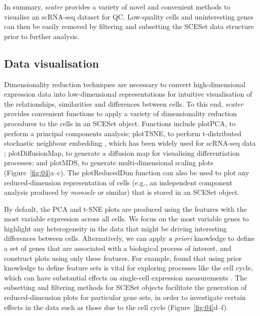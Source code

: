 \documentclass{bioinfo}
\begin{document}
In summary, \emph{scater} provides a variety of novel and convenient
methods to visualise an scRNA-seq dataset for QC. Low-quality cells and
uninteresting genes can then be easily removed by filtering and
subsetting the SCESet data structure prior to further analysis.


\subsection{Data visualisation}\label{data-visualisation}

Dimensionality reduction techniques are necessary to convert
high-dimensional expression data into low-dimensional representations
for intuitive visualisation of the relationships, similarities and
differences between cells. To this end, \emph{scater} provides
convenient functions to apply a variety of dimensionality reduction
procedures to the cells in an SCESet object. Functions include plotPCA,
to perform a principal components analysis; plotTSNE, to perform
t-distributed stochastic neighbour embedding \citep{Van_der_Maaten2008-oe}, which has
been widely used for scRNA-seq data \citep{Amir2013-nf,Bendall2014-gf,Macosko2015-vt};
plotDiffusionMap, to generate a diffusion map \citep{Haghverdi2015-fm} for
visualising differentiation processes; and plotMDS, to generate
multi-dimensional scaling plots (Figure~\ref{fig:04}a--c). The plotReducedDim
function can also be used to plot any reduced-dimension representation of cells
(e.g., an independent component analysis produced by \emph{monocle}
\citep{Trapnell2013-fv} or similar) that is stored in an SCESet object.

By default, the PCA and t-SNE plots are produced using the features with
the most variable expression across all cells. We focus on the most variable genes to highlight any
heterogeneity in the data that might be driving interesting differences between
cells. Alternatively, we can apply \emph{a priori} knowledge to define a set of
genes that are associated with a biological process of interest, and construct
plots using only these features. For example, \citealp{Scialdone2015-gj}
found that using prior knowledge to define feature sets is vital for
exploring processes like the cell cycle, which can have substantial effects on
single-cell expression measurements \citep{Buettner2015-jg}. The subsetting and
filtering methods for SCESet objects facilitate the generation of
reduced-dimension plots for particular gene sets, in order to
investigate certain effects in the data such as those due to the cell
cycle (Figure~\ref{fig:04}d--f).
\end{document}
